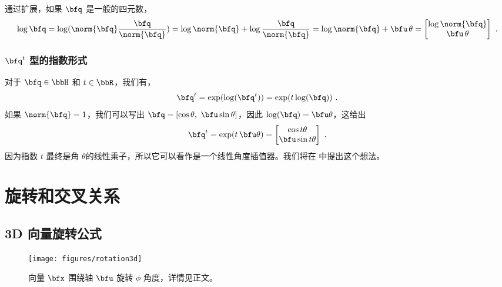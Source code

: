 通过扩展，如果 $\bfq$ 是一般的四元数，
%
\begin{align}
\log\bfq = \log(\norm{\bfq}\frac{\bfq}{\norm{\bfq}}) = \log\norm{\bfq} + \log\frac{\bfq}{\norm{\bfq}} = \log\norm{\bfq} + \bfu\,\theta = \begin{bmatrix}
\log\norm{\bfq} \\ \bfu\,\theta
\end{bmatrix}
~.
\end{align}

\subsubsection{ $\bfq^t$ 型的指数形式}

对于 $\bfq\in\bbH$ 和 $t\in\bbR$，我们有，
%
\begin{align}
\bfq^t = \exp(\log(\bfq^t)) = \exp(t\log(\bfq))
~.
\end{align}
%
如果 $\norm{\bfq}=1$，我们可以写出 $\bfq=[\cos\theta,~\bfu\sin\theta]$，因此 $\log(\bfq)=\bfu\theta$，这给出
%
\begin{align}\label{equ:qa}
\bfq^t = \exp(t\,\bfu\theta)=\begin{bmatrix}
\cos t\theta \\
\bfu\sin t\theta
\end{bmatrix}
~.
\end{align}
%
因为指数 $t$ 最终是角 $\theta$的线性乘子，所以它可以看作是一个线性角度插值器。我们将在  中提出这个想法。

\section{旋转和交叉关系}
\label{sec:rotations}

\subsection{3D 向量旋转公式}

\begin{figure}[htbp]
\centering
\texttt{[image: figures/rotation3d]}
\caption{向量 $\bfx$ 围绕轴 $\bfu$ 旋转 $\phi$ 角度，详情见正文。}
\label{fig:rotation3d}
\end{figure}

